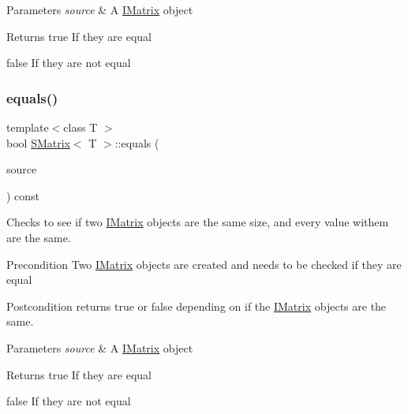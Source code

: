 \begin{DoxyParams}{Parameters}
{\em source} & A \mbox{\hyperlink{class_i_matrix}{I\+Matrix}} object \\
\hline
\end{DoxyParams}
\begin{DoxyReturn}{Returns}
true If they are equal 

false If they are not equal 
\end{DoxyReturn}
\mbox{\label{class_s_matrix_a00a5325d79d72dbc893bd1bdb0ee4ff4}} 
\subsubsection{\texorpdfstring{equals()}{equals()}\hspace{0.1cm}{\footnotesize\ttfamily [4/6]}}
{\footnotesize\ttfamily template$<$class T $>$ \\
bool \mbox{\hyperlink{class_s_matrix}{S\+Matrix}}$<$ T $>$\+::equals (\begin{DoxyParamCaption}\item[{const \mbox{\hyperlink{class_i_matrix}{I\+Matrix}}$<$ \mbox{\hyperlink{class_u_matrix}{U\+Matrix}}$<$ T $>$, T $>$ \&}]{source }\end{DoxyParamCaption}) const}



Checks to see if two \mbox{\hyperlink{class_i_matrix}{I\+Matrix}} objects are the same size, and every value withem are the same. 

\begin{DoxyPrecond}{Precondition}
Two \mbox{\hyperlink{class_i_matrix}{I\+Matrix}} objects are created and needs to be checked if they are equal 
\end{DoxyPrecond}
\begin{DoxyPostcond}{Postcondition}
returns true or false depending on if the \mbox{\hyperlink{class_i_matrix}{I\+Matrix}} objects are the same.
\end{DoxyPostcond}

\begin{DoxyParams}{Parameters}
{\em source} & A \mbox{\hyperlink{class_i_matrix}{I\+Matrix}} object \\
\hline
\end{DoxyParams}
\begin{DoxyReturn}{Returns}
true If they are equal 

false If they are not equal 
\end{DoxyReturn}
\mbox{\label{class_s_matrix_a72278dbea16105244b01d1793a405789}} 
